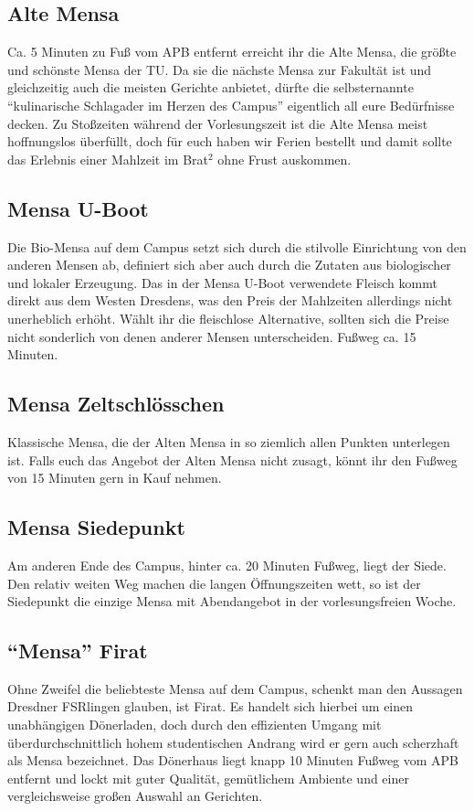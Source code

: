 \subsection*{Alte Mensa}
Ca. 5 Minuten zu Fuß vom APB entfernt erreicht ihr die Alte Mensa, die größte und schönste Mensa der TU\@.
Da sie die nächste Mensa zur Fakultät ist und gleichzeitig auch die meisten Gerichte anbietet, dürfte die selbsternannte \enquote{kulinarische Schlagader im Herzen des Campus} eigentlich all eure Bedürfnisse decken.
Zu Stoßzeiten während der Vorlesungszeit ist die Alte Mensa meist hoffnungslos überfüllt, doch für euch haben wir Ferien bestellt und damit sollte das Erlebnis einer Mahlzeit im Brat$^2$ ohne Frust auskommen.

\subsection*{Mensa U-Boot}
Die Bio-Mensa auf dem Campus setzt sich durch die stilvolle Einrichtung von den anderen Mensen ab, definiert sich aber auch durch die Zutaten aus biologischer und lokaler Erzeugung.
Das in der Mensa U-Boot verwendete Fleisch kommt direkt aus dem Westen Dresdens, was den Preis der Mahlzeiten allerdings nicht unerheblich erhöht.
Wählt ihr die fleischlose Alternative, sollten sich die Preise nicht sonderlich von denen anderer Mensen unterscheiden.
Fußweg ca. 15 Minuten.

\subsection*{Mensa Zeltschlösschen}
Klassische Mensa, die der Alten Mensa in so ziemlich allen Punkten unterlegen ist.
Falls euch das Angebot der Alten Mensa nicht zusagt, könnt ihr den Fußweg von 15 Minuten gern in Kauf nehmen.

\subsection*{Mensa Siedepunkt}
Am anderen Ende des Campus, hinter ca. 20 Minuten Fußweg, liegt der Siede.
Den relativ weiten Weg machen die langen Öffnungszeiten wett, so ist der Siedepunkt die einzige Mensa mit Abendangebot in der vorlesungsfreien Woche.

\subsection*{\enquote{Mensa} Firat}
Ohne Zweifel die beliebteste Mensa auf dem Campus, schenkt man den Aussagen Dresdner FSRlingen glauben, ist Firat.
Es handelt sich hierbei um einen unabhängigen Dönerladen, doch durch den effizienten Umgang mit überdurchschnittlich hohem studentischen Andrang wird er gern auch scherzhaft als Mensa bezeichnet.
Das Dönerhaus liegt knapp 10 Minuten Fußweg vom APB entfernt und lockt mit guter Qualität, gemütlichem Ambiente und einer vergleichsweise großen Auswahl an Gerichten.


